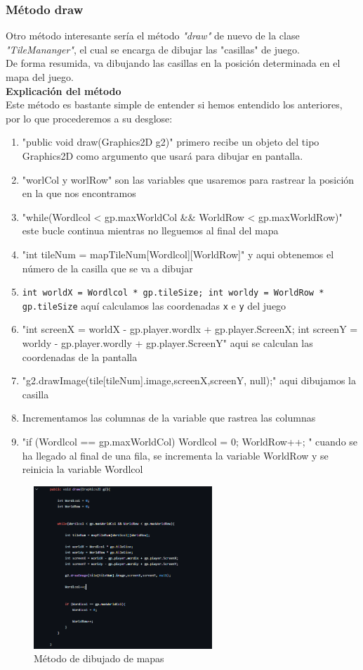 \documentclass[a4paper]{article}
\begin{document}
\subsubsection{Método draw}
Otro método interesante sería el método \textit{"draw"} de nuevo de la clase \textit{"TileMananger"}, el cual se encarga de dibujar las "casillas" de juego.\\
De forma resumida, va dibujando las casillas en la posición determinada en el mapa del juego.\\
\textbf{Explicación del método}\\
Este método es bastante simple de entender si hemos entendido los anteriores, por lo que procederemos a su desglose:
\begin{enumerate}
    \item "public void draw(Graphics2D g2)" primero recibe un objeto del tipo Graphics2D como argumento que usará para dibujar en pantalla.
    \item "worlCol y worlRow" son las variables que usaremos para rastrear la posición en la que nos encontramos
    \item "while(Wordlcol < gp.maxWorldCol \&\& WorldRow < gp.maxWorldRow)" este bucle continua mientras no lleguemos al final del mapa
    \item "int tileNum = mapTileNum[Wordlcol][WorldRow]" y aqui obtenemos el número de la casilla que se va a dibujar
    \item \texttt{int worldX = Wordlcol * gp.tileSize; int worldy = WorldRow * gp.tileSize} aquí calculamos las coordenadas \texttt{x} e \texttt{y} del juego
    \item "int screenX = worldX - gp.player.wordlx + gp.player.ScreenX; int screenY = worldy - gp.player.wordly + gp.player.ScreenY" aqui se calculan las coordenadas de la pantalla
    \item "g2.drawImage(tile[tileNum].image,screenX,screenY, null);" aqui dibujamos la casilla
    \item Incrementamos las columnas de la variable que rastrea las columnas
    \item "if (Wordlcol == gp.maxWorldCol){ Wordlcol = 0; WorldRow++; }" cuando se ha llegado al final de una fila, se incrementa la variable WorldRow y se reinicia la variable Wordlcol
\end{enumerate}
\begin{figure}[ht]
    \centering
    \includegraphics[width=0.6\textwidth]{Images/draw.PNG}
    \caption{Método de dibujado de mapas}
    \label{fig:metodos}
\end{figure}
\end{document}
